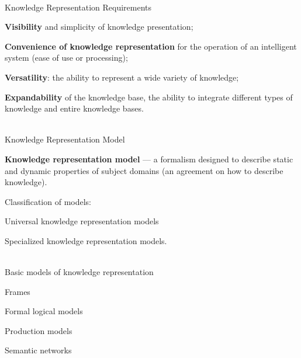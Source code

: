 \begin{frame}{\\Knowledge Representation Requirements}
	\topline
	\justifying
	
	\begin{textitemize}
		\item \textbf{Visibility} and simplicity of knowledge presentation;
		\item \textbf{Convenience of knowledge representation} for the operation of an intelligent system (ease of use or processing);
		\item \textbf{Versatility}: the ability to represent a wide variety of knowledge;
		\item \textbf{Expandability} of the knowledge base, the ability to integrate different types of knowledge and entire knowledge bases.
	\end{textitemize}
	
\end{frame}

\begin{frame}{\\Knowledge Representation Model}
	\topline
	\justifying
	
	\textbf{Knowledge representation model} --- a formalism designed to describe static and dynamic properties of subject domains (an agreement on how to describe knowledge).
	
	\vspace{1em}
	
	Classification of models:
	\begin{textitemize}
		\item Universal knowledge representation models
		\item Specialized knowledge representation models.
	\end{textitemize}
	
\end{frame}

\begin{frame}{\\Basic models of knowledge representation}
	\topline
	\justifying
	
	\begin{textitemize}
		\item Frames
		\item Formal logical models
		\item Production models
		\item Semantic networks
	\end{textitemize}
	
\end{frame}

